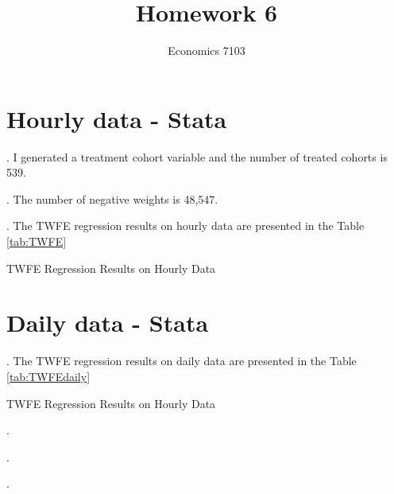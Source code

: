 \documentclass{article}
\title{Homework 6}
\author{Economics 7103}
\begin{document}
  
\maketitle

\section{Hourly data - Stata}
. I generated a treatment cohort variable and the number of treated cohorts is 539.

. The number of negative weights is  48,547.

. The TWFE regression results on hourly data are presented in the Table \ref{tab:TWFE}

\begin{table}[h]
    \centering
    
    \caption{TWFE Regression Results on Hourly Data}
    \label{tab:TWFE}
\end{table}

\clearpage

\section{Daily data - Stata}

. The TWFE regression results on daily data are presented in the Table \ref{tab:TWFEdaily}

\begin{table}[h]
    \centering
    
    \caption{TWFE Regression Results on Hourly Data}
    \label{tab:TWFEdaily}
\end{table}

.

. 

.
\end{document}
